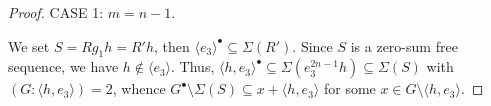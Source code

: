 \documentclass[a4paper, 10pt]{amsart}
\theoremstyle{plain}
\newtheorem{corollary}[theorem]{\bf Corollary}
\theoremstyle{definition}
\numberwithin{equation}{section}
\begin{document}
{\begin{proof}
	
	\smallskip
	\noindent
	CASE 1: $m=n-1$. 
	
	
	
	We set $S = R g_1 h=R'h$, then $\langle e_3\rangle^{\bullet}\subseteq \Sigma (R')$. 
	Since $S$ is a zero-sum free sequence,  we have $h\notin \langle e_3\rangle$. Thus,
	$\langle h,e_3 \rangle^{\bullet}\subseteq \Sigma (e_3^{2n-1} h)\subseteq \Sigma (S)$ with $(G: \langle h, e_3 \rangle)=2$, whence $G^{\bullet} \setminus \Sigma (S) \subseteq x + \langle h, e_3 \rangle$ for some $x \in G \setminus \langle h, e_3 \rangle$.



	

\end{proof}}
\end{document}
